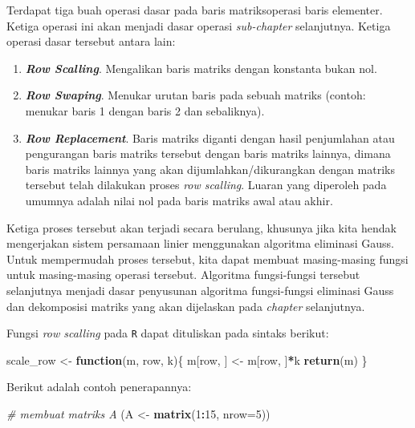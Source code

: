 \documentclass[
]{book}
\newenvironment{Shaded}{\begin{snugshade}}{\end{snugshade}}
\newcommand{\AttributeTok}[1]{\textcolor[rgb]{0.13,0.29,0.53}{#1}}
\newcommand{\CommentTok}[1]{\textcolor[rgb]{0.56,0.35,0.01}{\textit{#1}}}
\newcommand{\ControlFlowTok}[1]{\textcolor[rgb]{0.13,0.29,0.53}{\textbf{#1}}}
\newcommand{\DecValTok}[1]{\textcolor[rgb]{0.00,0.00,0.81}{#1}}
\newcommand{\FunctionTok}[1]{\textcolor[rgb]{0.13,0.29,0.53}{\textbf{#1}}}
\newcommand{\NormalTok}[1]{#1}
\newcommand{\OtherTok}[1]{\textcolor[rgb]{0.56,0.35,0.01}{#1}}
\newcommand{\SpecialCharTok}[1]{\textcolor[rgb]{0.81,0.36,0.00}{\textbf{#1}}}
\providecommand{\tightlist}{%
  \setlength{\itemsep}{0pt}\setlength{\parskip}{0pt}}
\theoremstyle{definition}
\theoremstyle{definition}
\theoremstyle{definition}
\theoremstyle{definition}
\theoremstyle{remark}
\begin{document}
Terdapat tiga buah operasi dasar pada baris matriksoperasi baris elementer. Ketiga operasi ini akan menjadi dasar operasi \emph{sub-chapter} selanjutnya. Ketiga operasi dasar tersebut antara lain:

\begin{enumerate}
\def\labelenumi{\arabic{enumi}.}
\tightlist
\item
  \textbf{\emph{Row Scalling}}. Mengalikan baris matriks dengan konstanta bukan nol.
\item
  \textbf{\emph{Row Swaping}}. Menukar urutan baris pada sebuah matriks (contoh: menukar baris 1 dengan baris 2 dan sebaliknya).
\item
  \textbf{\emph{Row Replacement}}. Baris matriks diganti dengan hasil penjumlahan atau pengurangan baris matriks tersebut dengan baris matriks lainnya, dimana baris matriks lainnya yang akan dijumlahkan/dikurangkan dengan matriks tersebut telah dilakukan proses \emph{row scalling}. Luaran yang diperoleh pada umumnya adalah nilai nol pada baris matriks awal atau akhir.
\end{enumerate}

Ketiga proses tersebut akan terjadi secara berulang, khusunya jika kita hendak mengerjakan sistem persamaan linier menggunakan algoritma eliminasi Gauss. Untuk mempermudah proses tersebut, kita dapat membuat masing-masing fungsi untuk masing-masing operasi tersebut. Algoritma fungsi-fungsi tersebut selanjutnya menjadi dasar penyusunan algoritma fungsi-fungsi eliminasi Gauss dan dekomposisi matriks yang akan dijelaskan pada \emph{chapter} selanjutnya.

Fungsi \emph{row scalling} pada \texttt{R} dapat dituliskan pada sintaks berikut:

\begin{Shaded}
\begin{Highlighting}[]
\NormalTok{scale\_row }\OtherTok{\textless{}{-}} \ControlFlowTok{function}\NormalTok{(m, row, k)\{}
\NormalTok{ m[row, ] }\OtherTok{\textless{}{-}}\NormalTok{ m[row, ]}\SpecialCharTok{*}\NormalTok{k}
 \FunctionTok{return}\NormalTok{(m)}
\NormalTok{\}}
\end{Highlighting}
\end{Shaded}

Berikut adalah contoh penerapannya:

\begin{Shaded}
\begin{Highlighting}[]
\CommentTok{\# membuat matriks A}
\NormalTok{(A }\OtherTok{\textless{}{-}} \FunctionTok{matrix}\NormalTok{(}\DecValTok{1}\SpecialCharTok{:}\DecValTok{15}\NormalTok{, }\AttributeTok{nrow=}\DecValTok{5}\NormalTok{))}
\end{Highlighting}
\end{Shaded}
\end{document}
